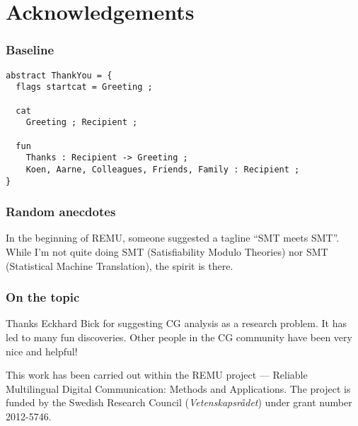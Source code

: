 \chapter*{Acknowledgements}\label{chp:acknowledgements}

\subsection*{Baseline}

\begin{verbatim}
abstract ThankYou = {
  flags startcat = Greeting ;

  cat 
    Greeting ; Recipient ;

  fun
    Thanks : Recipient -> Greeting ;
    Koen, Aarne, Colleagues, Friends, Family : Recipient ;
}
\end{verbatim}


\subsection*{Random anecdotes}

In the beginning of REMU, someone suggested a tagline ``SMT meets
SMT''. While I'm not quite doing SMT (Satisfiability Modulo Theories)
nor SMT (Statistical Machine Translation), the spirit is there.

\subsection*{On the topic}

Thanks Eckhard Bick for suggesting CG analysis as a research
problem. It has led to many fun discoveries.
Other people in the CG community 
have been very nice and helpful!


\vfill\noindent
This work has been carried out within the REMU project — Reliable Multilingual Digital Communication: Methods and Applications.
The project is funded by the Swedish Research Council (\emph{Vetenskapsrådet}) under grant number 2012-5746.
